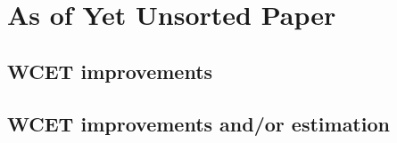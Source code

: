 \section{As of Yet Unsorted Paper}

\subsection{WCET improvements}
\cite{carle_et_al:OASIcs:2018:9749}
\cite{bansal2019cache}

\subsection{WCET improvements and/or estimation}
\cite{nguyen:hal-02044110}
